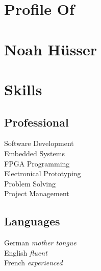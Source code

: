 \documentclass[]{resume}
\begin{document}

\section{Profile Of}
\section{Noah Hüsser}
\sectionsep




\makefacts


\section{Skills}

\subsection{Professional}
Software Development\\
Embedded Systems\\
FPGA Programming\\
Electronical Prototyping\\
Problem Solving\\
Project Management
\sectionsep

\subsection{Languages}
German \textit{mother tongue}\\
English \textit{fluent}\\
French  \textit{experienced}
\sectionsep
\end{document}
